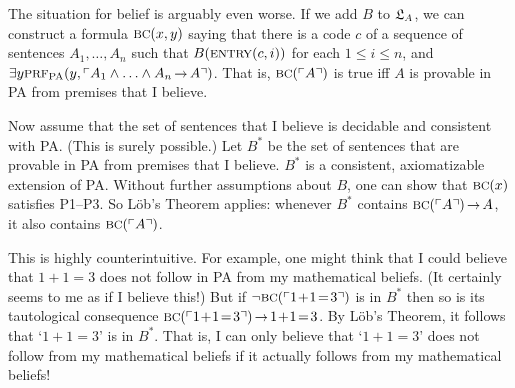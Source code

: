 The situation for belief is arguably even worse.
If we add $B$ to $\mathfrak{L}_A$,
we can construct a formula $\smallcaps{BC}(x,y)$ saying that
there is a code $c$ of a sequence of sentences $A_1, \ldots, A_n$ such that
$B(\smallcaps{entry}(c,i))$ for each $1 \leq i \leq n$,
and $\exists y \smallcaps{Prf}_{\mathrm{PA}}(y, \gn{A_1 \land \ldots \land A_n \to A})$.
That is, $\smallcaps{BC}(\gn{A})$ is true iff
$A$ is provable in PA from premises that I believe.

Now assume that
the set of sentences that I believe is decidable and consistent with PA.
(This is surely possible.)
Let $B^*$ be the set of sentences that are
provable in PA from premises that I believe.
$B^*$ is a consistent, axiomatizable extension of PA.
Without further assumptions about $B$,
one can show that $\smallcaps{BC}(x)$ satisfies P1--P3.
So Löb's Theorem applies:
whenever $B^*$ contains $\smallcaps{BC}(\gn{A}) \to A$,
it also contains $\smallcaps{BC}(\gn{A})$.

This is highly counterintuitive.
For example,
one might think that I could believe that
$1\!+\!1\! =\! 3$ does not follow in PA from my mathematical beliefs.
(It certainly seems to me as if I believe this!)
But if $\neg \smallcaps{BC}(\gn{1\!+\!1\!=\!3})$ is in $B^*$
then so is its tautological consequence $\smallcaps{BC}(\gn{1\!+\!1\!=\!3}) \to 1\!+\!1\!=\!3$.
By Löb's Theorem,
it follows that `$1\!+\!1\!=\!3$' is in $B^*$.
That is,
I can only believe that `$1\!+\!1\!=\!3$'
does not follow from my mathematical beliefs
if it actually follows from my mathematical beliefs!








